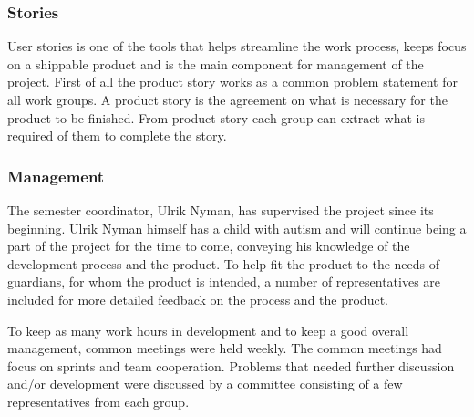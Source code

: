 \subsubsection{Stories}
\label{subsub:stories}
User stories is one of the tools that helps streamline the work process, keeps focus on a shippable product and is the main component for management of the project. First of all the product story works as a common problem statement for all work groups. A product story is the agreement on what is necessary for the product to be finished. From product story each group can extract what is required of them to complete the story.

\subsubsection{Management}
\label{subsub:management}
The semester coordinator, Ulrik Nyman, has supervised the project since its beginning. Ulrik Nyman himself has a child with autism and will continue being a part of the project for the time to come, conveying his knowledge of the development process and the product.
To help fit the product to the needs of guardians, for whom the product is intended, a number of representatives are included for more detailed feedback on the process and the product.


To keep as many work hours in development and to keep a good overall management, common meetings were held weekly.
The common meetings had focus on sprints and team cooperation. Problems that needed further discussion and/or development were discussed by a committee consisting of a few representatives from each group.

